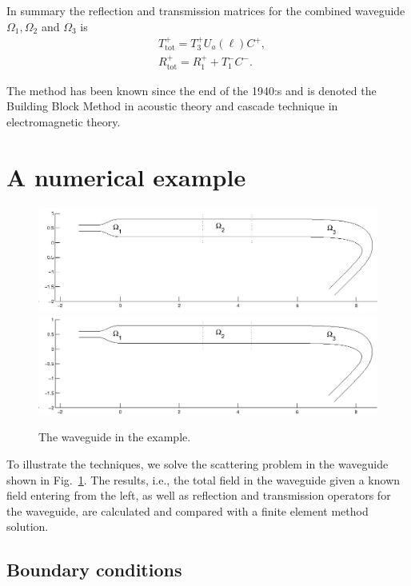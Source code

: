 \documentclass[numreferences]{kluwer}
\newcommand{\Ttot}{T^+_{\text{tot}}}
\newcommand{\Rtot}{R^+_{\text{tot}}}
\begin{document}
In summary the reflection and transmission matrices for the combined
waveguide $\Omega_1, \Omega_2$ and $\Omega_3$ is
\begin{equation}
  \label{eq:ABRtotTtot2}
  \begin{split}
    &\Ttot=T_3^{+}U_a(\ell)C^+,\\
    &\Rtot=R_1^{+}+T_1^{-}C^-.
  \end{split}
\end{equation}

The method has been known since the end of the 1940:s
\cite{kerns1949} and is denoted the Building Block Method
\cite{nilssonbrander1981b} in acoustic theory and cascade technique
\cite{jones1986} in electromagnetic theory.



\section{A numerical example}
\label{sec:numerical-example}
\begin{figure}[htb]
  \centering \ifpdf
  \includegraphics[width=\textwidth]{waveguide.jpg}
  \else
  \includegraphics[width=\textwidth]{waveguide.eps}
  \fi
  \caption{The waveguide in the example.}
  \label{fig:exwg}
\end{figure}
To illustrate the techniques, we solve the scattering problem
in the waveguide shown in Fig.~\ref{fig:exwg}.
The results, i.e., the total field in the waveguide given a known
field entering from the left, as well as reflection and transmission
operators for the waveguide, are calculated and compared with a finite
element method solution.

\subsection{Boundary conditions}
\label{sec:boundary-conditions}
\end{document}
